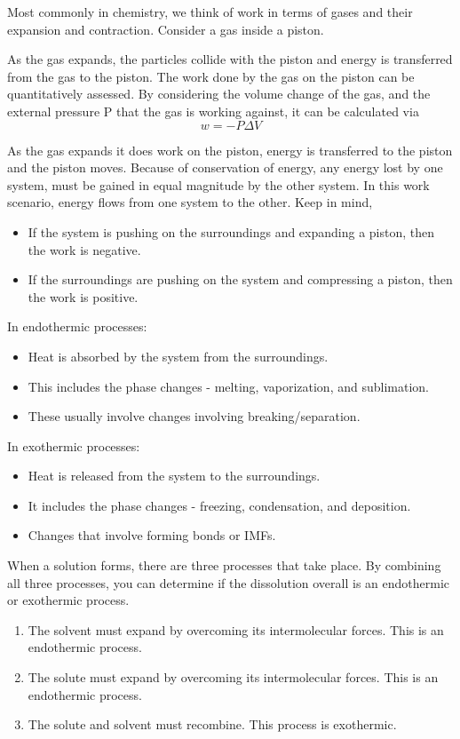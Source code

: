 \documentclass[../chem.tex]{subfiles}
\begin{document}
Most commonly in chemistry, we think of work in terms of gases and their expansion and contraction. Consider a gas inside a piston.

As the gas expands, the particles collide with the piston and energy is transferred from the gas to the piston. The work done by the gas on the piston can be 
quantitatively assessed. By considering the volume change of the gas, and the external pressure P that the gas is working against, it can be calculated via 
\[ w=-P\Delta V\]

As the gas expands it does work on the piston, energy is transferred to the piston and the piston moves. Because of conservation of energy, 
any energy lost by one system, must be gained in equal magnitude by the other system. In this work scenario, energy flows from one system to the other. Keep in mind, 
\begin{itemize}
    \item If the system is pushing on the surroundings and expanding a piston, then the work is negative.
    \item If the surroundings are pushing on the system and compressing a piston, then the work is positive.
\end{itemize}

In endothermic processes:
\begin{itemize}
    \item Heat is absorbed by the system from the surroundings.
    \item This includes the phase changes - melting, vaporization, and sublimation.
    \item These usually involve changes involving breaking/separation.
\end{itemize}

In exothermic processes:
\begin{itemize}
    \item Heat is released from the system to the surroundings.
    \item It includes the phase changes - freezing, condensation, and deposition.
    \item Changes that involve forming bonds or IMFs.
\end{itemize}

When a solution forms, there are three processes that take place. By combining all three processes, you can determine if the dissolution overall is an endothermic or exothermic process.
\begin{enumerate}
    \item The solvent must expand by overcoming its intermolecular forces. This is an endothermic process.
    \item The solute must expand by overcoming its intermolecular forces. This is an endothermic process.
    \item The solute and solvent must recombine. This process is exothermic.
\end{enumerate}
\end{document}
